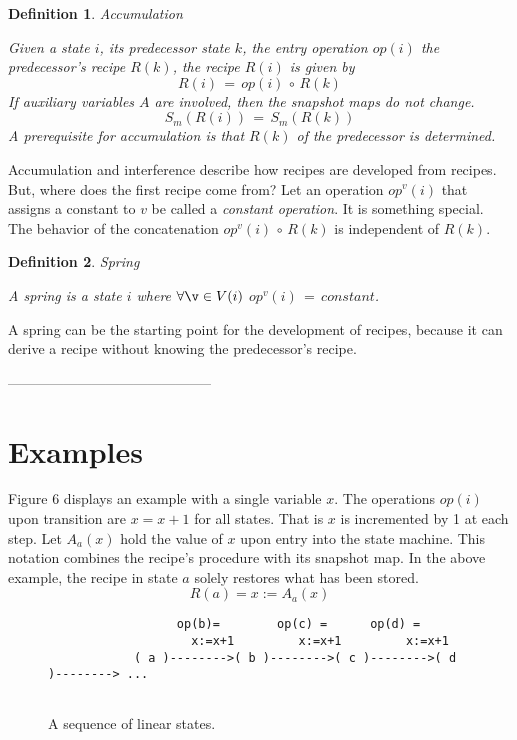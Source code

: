 \documentclass[12pt,a4paper]{scrartcl}
\newtheorem{definition}{Definition}
\begin{document}
\begin{definition} Accumulation

Given a state $i$, its predecessor state $k$, the entry operation $op(i)$
the predecessor's recipe $R(k)$, the recipe $R(i)$ is given by
\begin{equation}
       R(i)\,=\,op(i)\,\circ\,R(k)
\end{equation}
If auxiliary variables $A$ are involved, then the snapshot maps do not change. 
\begin{equation} \label{eq:accumulation-aux}
    S_m(R(i))\,=\,S_m(R(k))
\end{equation}
A prerequisite for accumulation is that $R(k)$ of the predecessor is 
determined.
\end{definition}
Accumulation and interference describe how recipes are developed from recipes.
But, where does the first recipe come from?  Let an operation $op^v(i)$ that
assigns a constant to $v$ be called a  \textit{constant operation}. It is something
special. The behavior of the concatenation $op^v(i)\,\circ\,R(k)$ is independent of
$R(k)$. 
\begin{definition} Spring

    A spring is a state $i$ where $\forall\v\in V(i)$ $op^v(i)\,=\,constant$.
    
\end{definition}
A spring can be the starting point for the development of recipes, because it
can derive a recipe without knowing the predecessor's recipe. 

--------------------------------------------

\section{Examples}
                 
Figure 6 displays an example with a single variable $x$. The operations $op(i)$
upon transition are $x=x+1$ for all states. That is $x$ is incremented by 1 at
each step. Let $A_a(x)$ hold the value of $x$ upon entry into the state machine. 
This notation combines the recipe's procedure with its snapshot map.
In the above example, the recipe in state $a$ solely restores what has been
stored.
\begin{equation}
\label{eq:}
           R(a) = { x := A_a(x) }                                     
\end{equation}

\begin{figure}[htbp] \leavevmode
\begin{verbatim}
                  op(b)=        op(c) =      op(d) =
                    x:=x+1         x:=x+1         x:=x+1        
            ( a )-------->( b )-------->( c )-------->( d )--------> ...


\end{verbatim}
\caption{A sequence of linear states.}
\end{figure}
\end{document}
